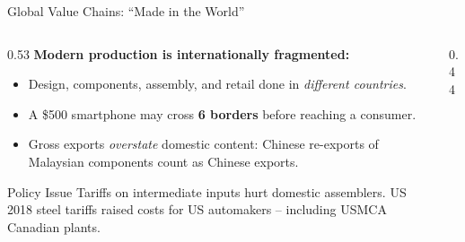 \documentclass[aspectratio=169]{beamer}
\begin{document}
\begin{frame}{Global Value Chains: ``Made in the World''}
\begin{columns}[T]
\begin{column}{0.53\textwidth}
\textbf{Modern production is internationally fragmented:}
\begin{itemize}\small
  \item Design, components, assembly, and retail done in \emph{different countries}.
  \item A \$500 smartphone may cross \textbf{6 borders} before reaching a consumer.
  \item Gross exports \emph{overstate} domestic content: Chinese re-exports of Malaysian components count as Chinese exports.
\end{itemize}
\vspace{0.2em}
\begin{insight}{Policy Issue}
\footnotesize Tariffs on intermediate inputs hurt domestic assemblers. US 2018 steel tariffs raised costs for US automakers -- including USMCA Canadian plants.
\end{insight}
\end{column}
\begin{column}{0.44\textwidth}
\end{column}
\end{columns}
\end{frame}
\end{document}
